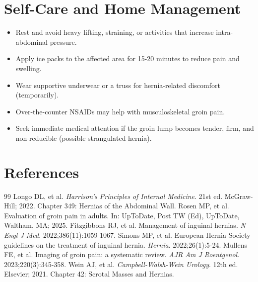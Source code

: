 \section*{Self-Care and Home Management}
\begin{itemize}
  \item Rest and avoid heavy lifting, straining, or activities that increase intra-abdominal pressure.
  \item Apply ice packs to the affected area for 15-20 minutes to reduce pain and swelling.
  \item Wear supportive underwear or a truss for hernia-related discomfort (temporarily).
  \item Over-the-counter NSAIDs may help with musculoskeletal groin pain.
  \item Seek immediate medical attention if the groin lump becomes tender, firm, and non-reducible (possible strangulated hernia).
\end{itemize}

\section*{References}

\begin{thebibliography}{99}
 Longo DL, et al. \emph{Harrison's Principles of Internal Medicine}. 21st ed. McGraw-Hill; 2022. Chapter 349: Hernias of the Abdominal Wall.
 Rosen MP, et al. Evaluation of groin pain in adults. In: UpToDate, Post TW (Ed), UpToDate, Waltham, MA; 2025.
 Fitzgibbons RJ, et al. Management of inguinal hernias. \emph{N Engl J Med}. 2022;386(11):1059-1067.
 Simons MP, et al. European Hernia Society guidelines on the treatment of inguinal hernia. \emph{Hernia}. 2022;26(1):5-24.
 Mullens FE, et al. Imaging of groin pain: a systematic review. \emph{AJR Am J Roentgenol}. 2023;220(3):345-358.
 Wein AJ, et al. \emph{Campbell-Walsh-Wein Urology}. 12th ed. Elsevier; 2021. Chapter 42: Scrotal Masses and Hernias.
\end{thebibliography}
